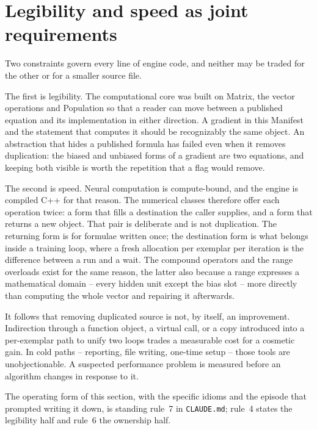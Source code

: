 \section{Legibility and speed as joint requirements}

Two constraints govern every line of engine code, and neither may be
traded for the other or for a smaller source file.

The first is legibility.  The computational core was built on Matrix,
the vector operations and Population so that a reader can move between
a published equation and its implementation in either direction.  A
gradient in this Manifest and the statement that computes it should be
recognizably the same object.  An abstraction that hides a published
formula has failed even when it removes duplication: the biased and
unbiased forms of a gradient are two equations, and keeping both
visible is worth the repetition that a flag would remove.

The second is speed.  Neural computation is compute-bound, and the
engine is compiled C++ for that reason.  The numerical classes
therefore offer each operation twice: a form that fills a destination
the caller supplies, and a form that returns a new object.  That pair
is deliberate and is not duplication.  The returning form is for
formulae written once; the destination form is what belongs inside a
training loop, where a fresh allocation per exemplar per iteration is
the difference between a run and a wait.  The compound operators and
the range overloads exist for the same reason, the latter also because
a range expresses a mathematical domain -- every hidden unit except the
bias slot -- more directly than computing the whole vector and
repairing it afterwards.

It follows that removing duplicated source is not, by itself, an
improvement.  Indirection through a function object, a virtual call, or
a copy introduced into a per-exemplar path to unify two loops trades a
measurable cost for a cosmetic gain.  In cold paths -- reporting, file
writing, one-time setup -- those tools are unobjectionable.  A
suspected performance problem is measured before an algorithm changes
in response to it.

The operating form of this section, with the specific idioms and the
episode that prompted writing it down, is standing rule~7 in
\texttt{CLAUDE.md}; rule~4 states the legibility half and rule~6 the
ownership half.


